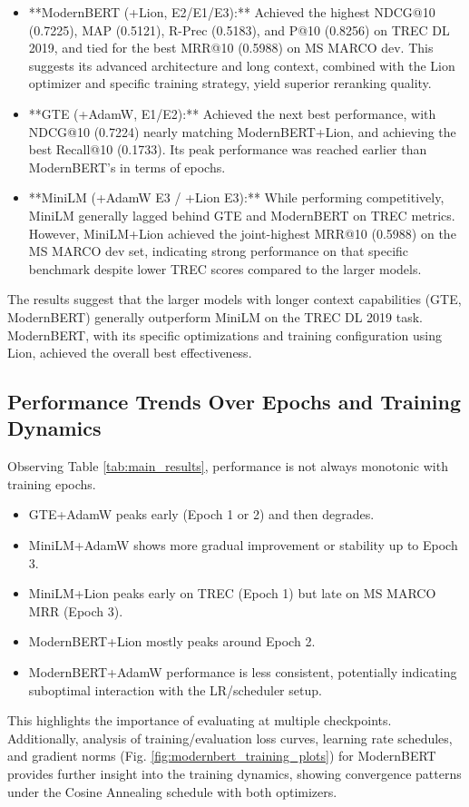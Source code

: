 \documentclass[conference]{IEEEtran}
\begin{document}
\begin{itemize}
    \item **ModernBERT (+Lion, E2/E1/E3):** Achieved the highest NDCG@10 (0.7225), MAP (0.5121), R-Prec (0.5183), and P@10 (0.8256) on TREC DL 2019, and tied for the best MRR@10 (0.5988) on MS MARCO dev. This suggests its advanced architecture and long context, combined with the Lion optimizer and specific training strategy, yield superior reranking quality.
    \item **GTE (+AdamW, E1/E2):** Achieved the next best performance, with NDCG@10 (0.7224) nearly matching ModernBERT+Lion, and achieving the best Recall@10 (0.1733). Its peak performance was reached earlier than ModernBERT's in terms of epochs.
    \item **MiniLM (+AdamW E3 / +Lion E3):** While performing competitively, MiniLM generally lagged behind GTE and ModernBERT on TREC metrics. However, MiniLM+Lion achieved the joint-highest MRR@10 (0.5988) on the MS MARCO dev set, indicating strong performance on that specific benchmark despite lower TREC scores compared to the larger models.
\end{itemize}
The results suggest that the larger models with longer context capabilities (GTE, ModernBERT) generally outperform MiniLM on the TREC DL 2019 task. ModernBERT, with its specific optimizations and training configuration using Lion, achieved the overall best effectiveness.

\subsection{Performance Trends Over Epochs and Training Dynamics}
Observing Table \ref{tab:main_results}, performance is not always monotonic with training epochs.
\begin{itemize}
    \item GTE+AdamW peaks early (Epoch 1 or 2) and then degrades.
    \item MiniLM+AdamW shows more gradual improvement or stability up to Epoch 3.
    \item MiniLM+Lion peaks early on TREC (Epoch 1) but late on MS MARCO MRR (Epoch 3).
    \item ModernBERT+Lion mostly peaks around Epoch 2.
    \item ModernBERT+AdamW performance is less consistent, potentially indicating suboptimal interaction with the LR/scheduler setup.
\end{itemize}
This highlights the importance of evaluating at multiple checkpoints. Additionally, analysis of training/evaluation loss curves, learning rate schedules, and gradient norms (Fig. \ref{fig:modernbert_training_plots}) for ModernBERT provides further insight into the training dynamics, showing convergence patterns under the Cosine Annealing schedule with both optimizers.
\end{document}
